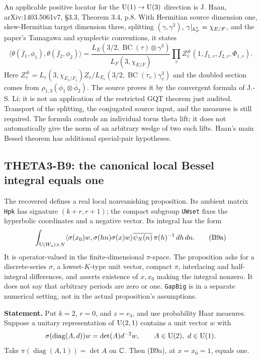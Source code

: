 \documentclass[11pt]{article}
\theoremstyle{definition}\newtheorem{definition}[theorem]{Definition}\newtheorem{remark}[theorem]{Remark}
\begin{document}
An applicable positive locator for the $\operatorname{U}(1)\to\operatorname{U}(3)$ direction is J. Haan, arXiv:1403.5061v7, \S3.3, Theorem 3.4, p.8. With Hermitian source dimension one, skew-Hermitian target dimension three, splitting $(\gamma,\gamma^3)$, $\gamma|_{\mathbb A_F^*}=\chi_{E/F}$, and the paper's Tamagawa and symplectic conventions, it states
\[
 \langle\theta(\overline f_1,\phi_1),\theta(\overline f_2,\phi_2)\rangle
 =\frac{L_E(3/2,\operatorname{BC}(\tau)\otimes\gamma^3)}
        {L_F(3,\chi_{E/F})}
   \prod_v Z_v^{\#}(1,f_{1,v},f_{2,v},\Phi_{1,v}).
\]
Here $Z_v^{\#}=L_v(3,\chi_{E_v/F_v})Z_v/L_{E_v}(3/2,\operatorname{BC}(\tau_v)\gamma_v^3)$ and the doubled section comes from $\rho_{1,3}(\phi_1\otimes\overline\phi_2)$. The source proves it by the convergent formula of J.-S. Li; it is not an application of the restricted GQT theorem just audited. Transport of the splitting, the conjugated source input, and the measures is still required. The formula controls an individual torus theta lift; it does not automatically give the norm of an arbitrary wedge of two such lifts. Haan's main Bessel theorem has additional special-pair hypotheses.

\subsection{THETA3-B9: the canonical local Bessel integral equals one}\label{B9}

The recovered  defines a real local nonvanishing proposition. Its ambient matrix \texttt{Hpk} has signature $(k+r,r+1)$; the compact subgroup \texttt{UWset} fixes the hyperbolic coordinates and a negative vector. Its integral has the form
\[
 \int_{\operatorname{U}(W_z)\times N}
 \langle\sigma(x_0)w,\sigma(hn)\sigma(x)w\rangle
       \overline{\psi_N(n)}\,\pi(h)^{-1}\,dh\,dn.
 \tag{B9a}
\]
It is operator-valued in the finite-dimensional $\pi$-space. The proposition asks for a discrete-series $\sigma$, a lowest-$K$-type unit vector, compact $\pi$, interlacing and half-integral differences, and asserts existence of $x,x_0$ making the integral nonzero. It does not say that arbitrary periods are zero or one. \texttt{GapBig} is in a separate numerical setting, not in the actual proposition's assumptions.

\textbf{Statement.} Put $k=2$, $r=0$, and $z=e_3$, and use probability Haar measures. Suppose a unitary representation of $\operatorname{U}(2,1)$ contains a unit vector $w$ with
\[
 \sigma(\operatorname{diag}(A,d))w=\det(A)d^{-2}w,
 \qquad A\in\operatorname{U}(2),\ d\in\operatorname{U}(1).
\]
Take $\pi(\operatorname{diag}(A,1))=\det A$ on $\mathbb C$. Then (B9a), at $x=x_0=1$, equals one.
\end{document}
